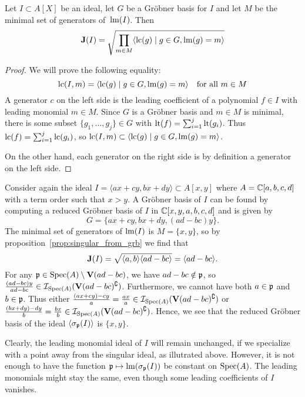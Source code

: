 \begin{proposition}\label{prop:singular_from_grb}
  Let $I \subset A[X]$ be an ideal, let $G$ be a Gröbner basis for $I$ and let $M$ be the minimal set of generators of $\,\operatorname{lm}(I)$. Then
  \[\operatorname{\mathbf J}(I) = \sqrt{\prod_{m \in M} \langle \operatorname{lc}(g) \mid g \in G, \operatorname{lm}(g) = m \rangle }\]
\end{proposition}
\begin{proof}
  We will prove the following equality:
  \[\operatorname{lc}(I, m) = \langle \operatorname{lc}(g) \mid g \in G, \operatorname{lm}(g) = m \rangle \quad \text{for all $m \in M$} \]
  A generator $c$ on the left side is the leading coefficient of a polynomial $f \in I$ with leading monomial $m \in M$. Since $G$ is a Gröbner basis and $m \in M$ is minimal, there is some subset $\{g_{1}, \dots, g_{j}\} \in G$ with $\operatorname{lt}(f) = \sum_{i=1}^{j} \operatorname{lt}(g_{i})$. Thus $\operatorname{lc}(f) = \sum_{i=1}^{j} \operatorname{lc}(g_{i})$, so $\operatorname{lc}(I, m) \subset \langle \operatorname{lc}(g) \mid g \in G, \operatorname{lm}(g) = m \rangle$.

  On the other hand, each generator on the right side is by definition a generator on the left side.
\end{proof}

\begin{example}\upshape
  Consider again the ideal $I = \langle ax + cy, bx + dy \rangle \subset A[x, y]$ where $A = \mathbb{C}[a, b, c, d]$ with a term order such that $x > y$. A Gröbner basis of $I$ can be found by computing a reduced Gröbner basis of $I$ in $\mathbb{C}[x, y, a, b, c, d]$ and is given by
  \[G = \{ax + cy, bx + dy, (ad - bc)y\}.\]
  The minimal set of generators of $\operatorname{lm}(I)$ is $M = \{x, y\}$, so by proposition~\ref{prop:singular_from_grb} we find that
  \[\operatorname{\mathbf J}(I) = \sqrt{\langle a, b \rangle \langle ad - bc \rangle} = \langle ad - bc \rangle.\]
  For any $\mathfrak p \in \operatorname{Spec}(A) \setminus \operatorname{\mathbf V}(ad - bc)$, we have $ad - bc \notin \mathfrak p$, so $\frac{(ad - bc)y}{ad - bc} \in \mathcal I_{\operatorname{Spec}(A)}(\operatorname{\mathbf V}(ad - bc)^{\complement})$. Furthermore, we cannot have both $a \in \mathfrak p$ and $b \in \mathfrak p$. Thus either $\frac{(ax + cy) - cy}{a} = \frac{ax}{a} \in \mathcal I_{\operatorname{Spec}(A)}(\operatorname{\mathbf V}(ad - bc)^{\complement})$ or $\frac{(bx + dy) - dy}{b} = \frac{bx}{b} \in \mathcal I_{\operatorname{Spec}(A)}(\operatorname{\mathbf V}(ad - bc)^{\complement})$. Hence, we see that the reduced Gröbner basis of the ideal $\langle \sigma_{\mathfrak p}(I) \rangle$ is $\{x, y\}$.
\end{example}


Clearly, the leading monomial ideal of $I$ will remain unchanged, if we specialize with a point away from the singular ideal, as illutrated above. However, it is not enough to have the function $\mathfrak p \mapsto \operatorname{lm}(\sigma_{\mathfrak p}(I))$ be constant on $\operatorname{Spec}(A)$. The leading monomials might stay the same, even though some leading coefficients of $I$ vanishes.

